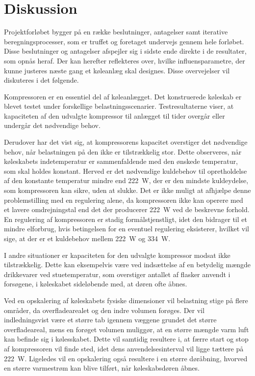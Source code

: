 \documentclass[../Hovedrapport.tex]{subfiles}
\begin{document}
\section{Diskussion}
Projektforløbet bygger på en række beslutninger, antagelser samt iterative beregningsprocesser, som er truffet og foretaget undervejs gennem hele forløbet. Disse beslutninger og antagelser afspejler sig i sidste ende direkte i de resultater, som opnås heraf. Der kan herefter reflekteres over, hvilke influensparametre, der kunne justeres næste gang et køleanlæg skal designes. Disse overvejelser vil diskuteres i det følgende.

Kompressoren er en essentiel del af køleanlægget. Det konstruerede køleskab er blevet testet under forskellige belastningsscenarier. Testresultaterne viser, at kapaciteten af den udvalgte kompressor til anlægget til tider overgår eller undergår det nødvendige behov.

Derudover har det vist sig, at kompressorens kapacitet overstiger det nødvendige behov, når belastningen på den ikke er tilstrækkelig stor. Dette observeres, når køleskabets indetemperatur er sammenfaldende med den ønskede temperatur, som skal holdes konstant. Herved er det nødvendige kuldebehov til opretholdelse af den konstante temperatur mindre end \SI{222}{\watt}, der er den mindste kuldeydelse, som kompressoren kan sikre, uden at slukke. Det er ikke muligt at afhjælpe denne problemstilling med en regulering alene, da kompressoren ikke kan operere med et lavere omdrejningstal end det der producerer \SI{222}{\watt} ved de beskrevne forhold. En regulering af kompressoren er stadig formålstjenstligt, idet den bidrager til et mindre elforbrug, hvis betingelsen for en eventuel regulering eksisterer, hvilket vil sige, at der er et kuldebehov mellem \SI{222}{\watt} og \SI{334}{\watt}.

I andre situationer er kapaciteten for den udvalgte kompressor modsat ikke tilstrækkelig. Dette kan eksempelvis være ved indsættelse af en betydelig mængde drikkevarer ved stuetemperatur, som overstiger antallet af flasker anvendt i forsøgene, i køleskabet sideløbende med, at døren ofte åbnes. 

Ved en opskalering af køleskabets fysiske dimensioner vil belastning stige på flere områder, da overfladearealet og den indre volumen forøges. Der vil indledningsvist være et større tab igennem væggene grundet det større overfladeareal, mens en forøget volumen muliggør, at en større mængde varm luft kan befinde sig i kølesskabet. Dette vil samtidig resultere i, at færre start og stop af kompressoren vil finde sted, idet dens anvendelsesinterval vil ligge tættere på \SI{222}{\watt}. Ligeledes vil en opskalering også resultere i en større døråbning, hvorved en større varmestrøm kan blive tilført, når køleskabsdøren åbnes. 
\end{document}
